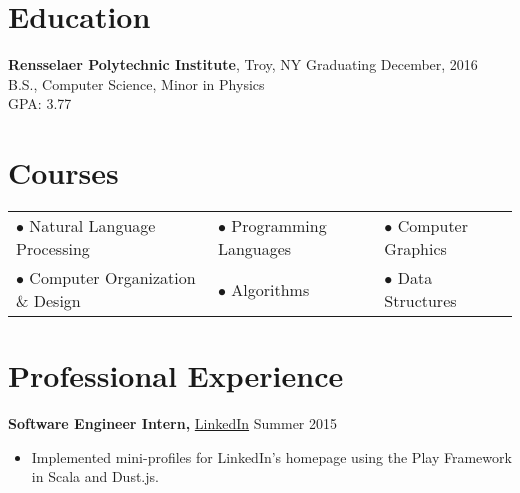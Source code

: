 \documentclass[margin]{res}
\begin{document}
\begin{minipage}{\textwidth}


\begin{resume}

\section{Education}
{\bf Rensselaer Polytechnic Institute}, Troy, NY \hfill Graduating December, 2016 \\
B.S., Computer Science, Minor in Physics \\
GPA: 3.77

\section{Courses}
\begin{tabular}{lll}
$\bullet$ Natural Language Processing & $\bullet$ Programming Languages & $\bullet$ Computer Graphics \\
$\bullet$ Computer Organization \& Design & $\bullet$ Algorithms & $\bullet$ Data Structures \\
\end{tabular}

\section{Professional Experience}
{\bf Software Engineer Intern,} \uline{LinkedIn} \hfill Summer 2015
 \begin{itemize} \itemsep -2pt %
 \item Implemented mini-profiles for LinkedIn's homepage using the Play Framework in Scala and Dust.js.
 \end{itemize}




\end{resume}
\end{minipage}
\end{document}
